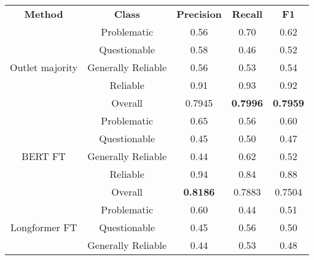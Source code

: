 \begin{table}[htbp]
    \centering
    \footnotesize
    \begin{tabular}{| c | c | c | c | c |}
        \hline                            \textbf{Method}  & \textbf{Class}     & \textbf{Precision} & \textbf{Recall} & \textbf{F1}     \\\cline{1-5}
        \multirow{5}{*}{Outlet majority}                   & Problematic        & 0.56               & 0.70            & 0.62            \\
                                                           & Questionable       & 0.58               & 0.46            & 0.52            \\
                                                           & Generally Reliable & 0.56               & 0.53            & 0.54            \\
                                                           & Reliable           & 0.91               & 0.93            & 0.92            \\\cline{2-5}
                                                           & Overall            & 0.7945             & \textbf{0.7996} & \textbf{0.7959} \\
        \hline
        \multirow{5}{*}{BERT FT}                           & Problematic        & 0.65               & 0.56            & 0.60            \\
                                                           & Questionable       & 0.45               & 0.50            & 0.47            \\
                                                           & Generally Reliable & 0.44               & 0.62            & 0.52            \\
                                                           & Reliable           & 0.94               & 0.84            & 0.88            \\\cline{2-5}
                                                           & Overall            & \textbf{0.8186}    & 0.7883          & 0.7504          \\
        \hline
        \multirow{5}{*}{Longformer FT}                     & Problematic        & 0.60               & 0.44            & 0.51            \\
                                                           & Questionable       & 0.45               & 0.56            & 0.50            \\
                                                           & Generally Reliable & 0.44               & 0.53            & 0.48            \\

\end{tabular}
\end{table}
